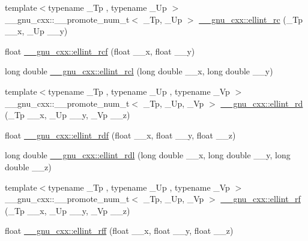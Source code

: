 \begin{DoxyCompactItemize}
\item 
{\footnotesize template$<$typename \+\_\+\+Tp , typename \+\_\+\+Up $>$ }\\\+\_\+\+\_\+gnu\+\_\+cxx\+::\+\_\+\+\_\+promote\+\_\+num\+\_\+t$<$ \+\_\+\+Tp, \+\_\+\+Up $>$ \hyperlink{group__gnu__math__spec__func_ga183d78859b56f93237567e6322164832}{\+\_\+\+\_\+gnu\+\_\+cxx\+::ellint\+\_\+rc} (\+\_\+\+Tp \+\_\+\+\_\+x, \+\_\+\+Up \+\_\+\+\_\+y)
\item 
float \hyperlink{group__gnu__math__spec__func_gaad5316092224ec3d92b66e79ef266adf}{\+\_\+\+\_\+gnu\+\_\+cxx\+::ellint\+\_\+rcf} (float \+\_\+\+\_\+x, float \+\_\+\+\_\+y)
\item 
long double \hyperlink{group__gnu__math__spec__func_ga9b2f1cdeacd3615c702a77d995a0129c}{\+\_\+\+\_\+gnu\+\_\+cxx\+::ellint\+\_\+rcl} (long double \+\_\+\+\_\+x, long double \+\_\+\+\_\+y)
\item 
{\footnotesize template$<$typename \+\_\+\+Tp , typename \+\_\+\+Up , typename \+\_\+\+Vp $>$ }\\\+\_\+\+\_\+gnu\+\_\+cxx\+::\+\_\+\+\_\+promote\+\_\+num\+\_\+t$<$ \+\_\+\+Tp, \+\_\+\+Up, \+\_\+\+Vp $>$ \hyperlink{group__gnu__math__spec__func_ga812c4f543575006c6b555d1385b88d90}{\+\_\+\+\_\+gnu\+\_\+cxx\+::ellint\+\_\+rd} (\+\_\+\+Tp \+\_\+\+\_\+x, \+\_\+\+Up \+\_\+\+\_\+y, \+\_\+\+Vp \+\_\+\+\_\+z)
\item 
float \hyperlink{group__gnu__math__spec__func_ga52e7cc797b9d199b7468cdbec6505357}{\+\_\+\+\_\+gnu\+\_\+cxx\+::ellint\+\_\+rdf} (float \+\_\+\+\_\+x, float \+\_\+\+\_\+y, float \+\_\+\+\_\+z)
\item 
long double \hyperlink{group__gnu__math__spec__func_ga68a38a5f320a7184cec4b120ddef6a65}{\+\_\+\+\_\+gnu\+\_\+cxx\+::ellint\+\_\+rdl} (long double \+\_\+\+\_\+x, long double \+\_\+\+\_\+y, long double \+\_\+\+\_\+z)
\item 
{\footnotesize template$<$typename \+\_\+\+Tp , typename \+\_\+\+Up , typename \+\_\+\+Vp $>$ }\\\+\_\+\+\_\+gnu\+\_\+cxx\+::\+\_\+\+\_\+promote\+\_\+num\+\_\+t$<$ \+\_\+\+Tp, \+\_\+\+Up, \+\_\+\+Vp $>$ \hyperlink{group__gnu__math__spec__func_gad276bd7533a87ca6d658cebc00a11b0a}{\+\_\+\+\_\+gnu\+\_\+cxx\+::ellint\+\_\+rf} (\+\_\+\+Tp \+\_\+\+\_\+x, \+\_\+\+Up \+\_\+\+\_\+y, \+\_\+\+Vp \+\_\+\+\_\+z)
\item 
float \hyperlink{group__gnu__math__spec__func_ga39acf5c69a85f9b687478b32847156da}{\+\_\+\+\_\+gnu\+\_\+cxx\+::ellint\+\_\+rff} (float \+\_\+\+\_\+x, float \+\_\+\+\_\+y, float \+\_\+\+\_\+z)
\item 

\end{DoxyCompactItemize}
